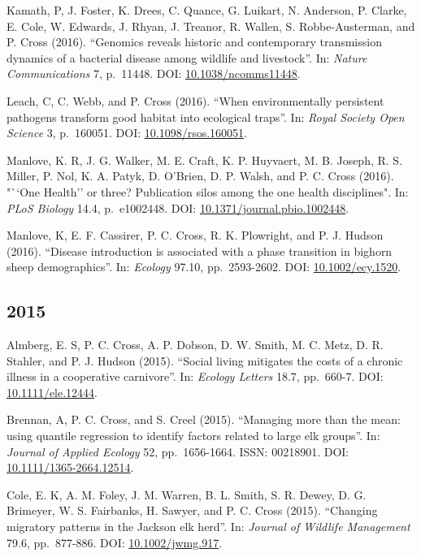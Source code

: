 \documentclass[12pt,]{article}
\begin{document}
Kamath, P, J. Foster, K. Drees, C. Quance, G. Luikart, N. Anderson, P.
Clarke, E. Cole, W. Edwards, J. Rhyan, J. Treanor, R. Wallen, S.
Robbe-Austerman, and P. Cross (2016). ``Genomics reveals historic and
contemporary transmission dynamics of a bacterial disease among wildlife
and livestock''. In: \emph{Nature Communications} 7, p.~11448. DOI:
\href{https://doi.org/10.1038\%2Fncomms11448}{10.1038/ncomms11448}.

Leach, C, C. Webb, and P. Cross (2016). ``When environmentally
persistent pathogens transform good habitat into ecological traps''. In:
\emph{Royal Society Open Science} 3, p.~160051. DOI:
\href{https://doi.org/10.1098\%2Frsos.160051}{10.1098/rsos.160051}.

Manlove, K. R, J. G. Walker, M. E. Craft, K. P. Huyvaert, M. B. Joseph,
R. S. Miller, P. Nol, K. A. Patyk, D. O'Brien, D. P. Walsh, and P. C.
Cross (2016). "``One Health'' or three? Publication silos among the one
health disciplines". In: \emph{PLoS Biology} 14.4, p.~e1002448. DOI:
\href{https://doi.org/10.1371\%2Fjournal.pbio.1002448}{10.1371/journal.pbio.1002448}.

Manlove, K, E. F. Cassirer, P. C. Cross, R. K. Plowright, and P. J.
Hudson (2016). ``Disease introduction is associated with a phase
transition in bighorn sheep demographics''. In: \emph{Ecology} 97.10,
pp.~2593-2602. DOI:
\href{https://doi.org/10.1002\%2Fecy.1520}{10.1002/ecy.1520}.

\hypertarget{section-4}{%
\subsection{2015}\label{section-4}}

Almberg, E. S, P. C. Cross, A. P. Dobson, D. W. Smith, M. C. Metz, D. R.
Stahler, and P. J. Hudson (2015). ``Social living mitigates the costs of
a chronic illness in a cooperative carnivore''. In: \emph{Ecology
Letters} 18.7, pp.~660-7. DOI:
\href{https://doi.org/10.1111\%2Fele.12444}{10.1111/ele.12444}.

Brennan, A, P. C. Cross, and S. Creel (2015). ``Managing more than the
mean: using quantile regression to identify factors related to large elk
groups''. In: \emph{Journal of Applied Ecology} 52, pp.~1656-1664. ISSN:
00218901. DOI:
\href{https://doi.org/10.1111\%2F1365-2664.12514}{10.1111/1365-2664.12514}.

Cole, E. K, A. M. Foley, J. M. Warren, B. L. Smith, S. R. Dewey, D. G.
Brimeyer, W. S. Fairbanks, H. Sawyer, and P. C. Cross (2015). ``Changing
migratory patterns in the Jackson elk herd''. In: \emph{Journal of
Wildlife Management} 79.6, pp.~877-886. DOI:
\href{https://doi.org/10.1002\%2Fjwmg.917}{10.1002/jwmg.917}.
\end{document}
